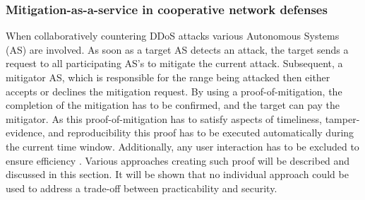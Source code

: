 \subsubsection{Mitigation-as-a-service in cooperative network defenses}
When collaboratively countering DDoS attacks various Autonomous Systems (AS) are involved. As soon as a target AS detects an attack, the target sends a request to all participating AS's to mitigate the current attack. Subsequent, a mitigator AS, which is responsible for the range being attacked then either accepts or declines the mitigation request. By using a proof-of-mitigation, the completion of the mitigation has to be confirmed, and the target can pay the mitigator. As this proof-of-mitigation has to satisfy aspects of timeliness, tamper-evidence, and reproducibility this proof has to be executed automatically during the current time window. Additionally, any user interaction has to be excluded to ensure efficiency \cite{Mannhart2018}. Various approaches creating such proof will be described and discussed in this section. It will be shown that no individual approach could be used to address a trade-off between practicability and security.

